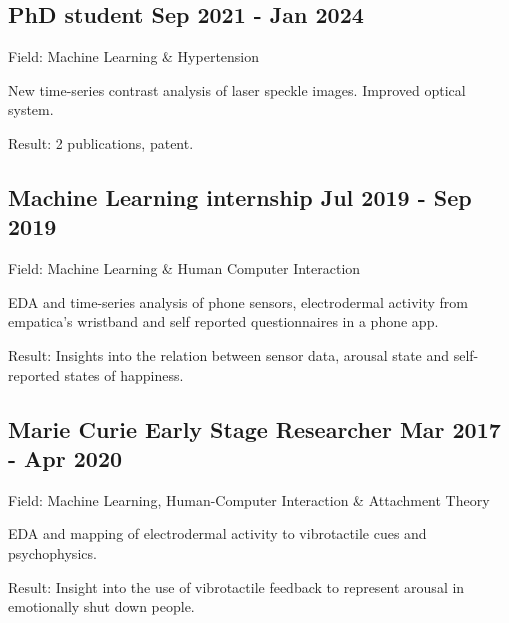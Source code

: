 \documentclass[a4paper,12pt]{article}
\begin{document}

\subsection{PhD student \hfill Sep 2021 - Jan 2024}
\vspace*{1pt}
Field: Machine Learning \& Hypertension \\
\vspace*{\spaceAfterField}
\begin{zitemize}
\item New time-series contrast analysis of laser speckle images. Improved optical system.
\item Result: 2 publications, patent.
\end{zitemize}
\vspace*{5pt}


\subsection{Machine Learning internship \hfill Jul 2019 - Sep 2019}
\vspace*{1pt}
Field: Machine Learning \& Human Computer Interaction \\
\vspace*{\spaceAfterField}
\begin{zitemize}
\item EDA and time-series analysis of phone sensors, electrodermal activity from empatica's wristband and self reported questionnaires in a phone app.
\item Result: Insights into the relation between sensor data, arousal state and self-reported states of happiness.
\end{zitemize}
\vspace*{5pt}


\subsection{Marie Curie Early Stage Researcher \hfill Mar 2017 - Apr 2020}
\vspace*{1pt}
Field: Machine Learning, Human-Computer Interaction \& Attachment Theory
\vspace*{\spaceAfterField}
\begin{zitemize}
\item EDA and mapping of electrodermal activity to vibrotactile cues and psychophysics.
\item Result: Insight into the use of vibrotactile feedback to represent arousal in emotionally shut down people.
\end{zitemize}
\vspace*{5pt}
\end{document}
